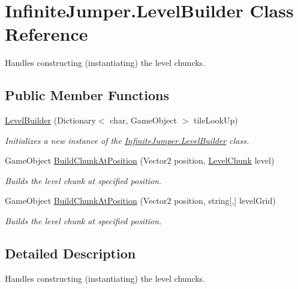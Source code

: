 \hypertarget{class_infinite_jumper_1_1_level_builder}{}\section{Infinite\+Jumper.\+Level\+Builder Class Reference}
\label{class_infinite_jumper_1_1_level_builder}


Handles constructing (instantiating) the level chuncks.  


\subsection*{Public Member Functions}
\begin{DoxyCompactItemize}
\item 
\hyperlink{class_infinite_jumper_1_1_level_builder_a4bb0f7102c300c9d633a8522f3714108}{Level\+Builder} (Dictionary$<$ char, Game\+Object $>$ tile\+Look\+Up)
\begin{DoxyCompactList}\small\item\em Initializes a new instance of the \hyperlink{class_infinite_jumper_1_1_level_builder}{Infinite\+Jumper.\+Level\+Builder} class. \end{DoxyCompactList}\item 
Game\+Object \hyperlink{class_infinite_jumper_1_1_level_builder_a1b688c46ce420781ac22b47e0379c451}{Build\+Chunk\+At\+Position} (Vector2 position, \hyperlink{class_infinite_jumper_1_1_level_chunk}{Level\+Chunk} level)
\begin{DoxyCompactList}\small\item\em Builds the level chunk at specified position. \end{DoxyCompactList}\item 
Game\+Object \hyperlink{class_infinite_jumper_1_1_level_builder_a5cec5a57ff946117829eed358398dc79}{Build\+Chunk\+At\+Position} (Vector2 position, string\mbox{[},\mbox{]} level\+Grid)
\begin{DoxyCompactList}\small\item\em Builds the level chunk at specified position. \end{DoxyCompactList}\end{DoxyCompactItemize}


\subsection{Detailed Description}
Handles constructing (instantiating) the level chuncks. 



